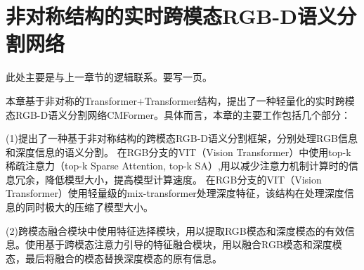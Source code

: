 



\chapter{非对称结构的实时跨模态RGB-D语义分割网络}



此处主要是与上一章节的逻辑联系。要写一页。

本章基于非对称的Transformer+Transformer结构，提出了一种轻量化的实时跨模态RGB-D语义分割网络CMFormer。具体而言，本章的主要工作包括几个部分：

(1)提出了一种基于非对称结构的跨模态RGB-D语义分割框架，分别处理RGB信息和深度信息的语义分割。
在RGB分支的VIT（Vision Transformer）中使用top-k稀疏注意力（top-k Sparse Attention, top-k SA）,用以减少注意力机制计算时的信息冗余，降低模型大小，提高模型计算速度。
在RGB分支的VIT（Vision Transformer）使用轻量级的mix-transformer处理深度特征，该结构在处理深度信息的同时极大的压缩了模型大小。
	
(2)跨模态融合模块中使用特征选择模块，用以提取RGB模态和深度模态的有效信息。使用基于跨模态注意力引导的特征融合模块，用以融合RGB模态和深度模态，最后将融合的模态替换深度模态的原有信息。

